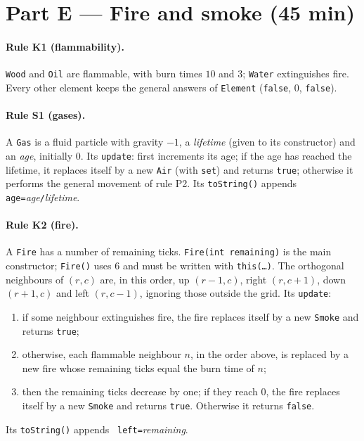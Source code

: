 \documentclass[11pt,a4paper]{article}
\newcommand{\code}[1]{\texttt{#1}}
\begin{document}
\section{Part E --- Fire and smoke (45 min)}

\paragraph{Rule K1 (flammability).} \code{Wood} and \code{Oil} are flammable, with burn times
\(10\) and \(3\); \code{Water} extinguishes fire. Every other element keeps the general answers
of \code{Element} (\code{false}, \(0\), \code{false}).

\paragraph{Rule S1 (gases).} A \code{Gas} is a fluid particle with gravity \(-1\), a
\emph{lifetime} (given to its constructor) and an \emph{age}, initially \(0\). Its \code{update}:
first increments its age; if the age has reached the lifetime, it replaces itself by a new
\code{Air} (with \code{set}) and returns \code{true}; otherwise it performs the general movement of
rule P2. Its \code{toString()} appends \verb*| age=|\textit{age}\verb|/|\textit{lifetime}.

\paragraph{Rule K2 (fire).} A \code{Fire} has a number of remaining ticks. \code{Fire(int remaining)}
is the main constructor; \code{Fire()} uses \(6\) and must be written with \code{this(\ldots)}.
The orthogonal neighbours of \((r,c)\) are, in this order, up \((r-1,c)\), right \((r,c+1)\),
down \((r+1,c)\) and left \((r,c-1)\), ignoring those outside the grid. Its \code{update}:
\begin{enumerate}[nosep]
  \item if some neighbour extinguishes fire, the fire replaces itself by a new \code{Smoke} and
        returns \code{true};
  \item otherwise, each flammable neighbour \(n\), in the order above, is replaced by a new fire
        whose remaining ticks equal the burn time of \(n\);
  \item then the remaining ticks decrease by one; if they reach \(0\), the fire replaces itself by
        a new \code{Smoke} and returns \code{true}. Otherwise it returns \code{false}.
\end{enumerate}
Its \code{toString()} appends \verb*| left=|\textit{remaining}.
\end{document}
